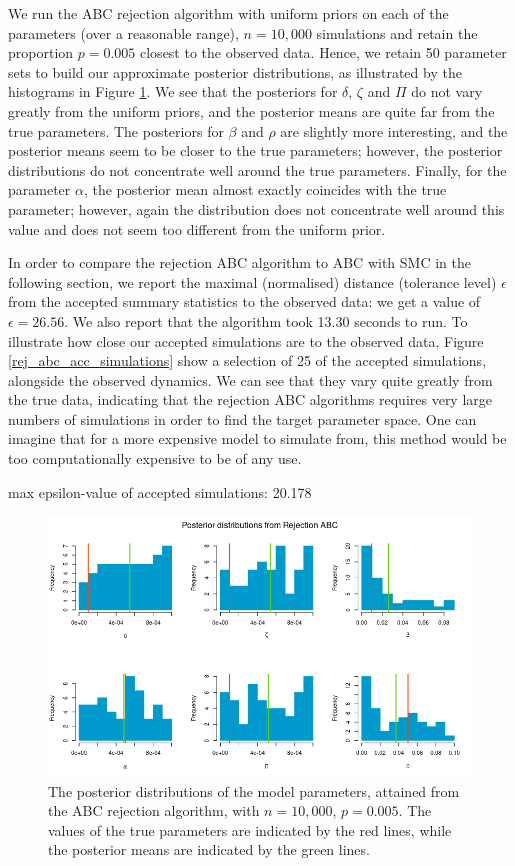 \documentclass[]{article}
\begin{document}
We run the ABC rejection algorithm with uniform priors on each of the parameters (over a reasonable range), $n=10,000$ simulations and retain the proportion $p=0.005$ closest to the observed data. Hence, we retain 50 parameter sets to build our approximate posterior distributions, as illustrated by the histograms in Figure \ref{rej_abc_posteriors}. We see that the posteriors for $\delta$, $\zeta$ and $\Pi$ do not vary greatly from the uniform priors, and the posterior means are quite far from the true parameters. The posteriors for $\beta$ and $\rho$ are slightly more interesting, and the posterior means seem to be closer to the true parameters; however, the posterior distributions do not concentrate well around the true parameters. Finally, for the parameter $\alpha$, the posterior mean almost exactly coincides with the true parameter; however, again the distribution does not concentrate well around this value and does not seem too different from the uniform prior.

In order to compare the rejection ABC algorithm to ABC with SMC in the following section, we report the maximal (normalised) distance (tolerance level) $\epsilon$ from the accepted summary statistics to the observed data: we get a value of $\epsilon = 26.56$. We also report that the algorithm took 13.30 seconds to run. To illustrate how close our accepted simulations are to the observed data, Figure \ref{rej_abc_acc_simulations} show a selection of 25 of the accepted simulations, alongside the observed dynamics. We can see that they vary quite greatly from the true data, indicating that the rejection ABC algorithms requires very large numbers of simulations in order to find the target parameter space. One can imagine that for a more expensive model to simulate from, this method would be too computationally expensive to be of any use.



max epsilon-value of accepted simulations: 20.178
\begin{figure}[H]
	\centering
	\includegraphics[width=1\linewidth]{../Figures/rejection_posteriors}
	\caption{The posterior distributions of the model parameters, attained from the ABC rejection algorithm, with $n=10,000$, $p=0.005$. The values of the true parameters are indicated by the red lines, while the posterior means are indicated by the green lines.}
	\label{rej_abc_posteriors}
\end{figure}
\end{document}
